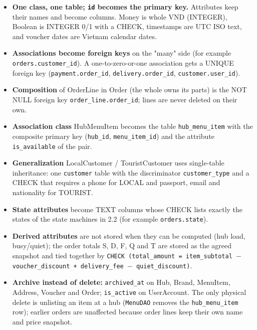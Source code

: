 \begin{itemize}
\item \textbf{One class, one table; \texttt{id} becomes the primary key.} Attributes keep their names and become columns. Money is whole VND (INTEGER), Boolean is INTEGER 0/1 with a CHECK, timestamps are UTC ISO text, and voucher dates are Vietnam calendar dates.

\item \textbf{Associations become foreign keys} on the "many" side (for example \texttt{orders.\allowbreak{}customer\_\allowbreak{}id}). A one-to-zero-or-one association gets a UNIQUE foreign key (\texttt{payment.\allowbreak{}order\_\allowbreak{}id}, \texttt{delivery.\allowbreak{}order\_\allowbreak{}id}, \texttt{customer.\allowbreak{}user\_\allowbreak{}id}).

\item \textbf{Composition} of OrderLine in Order (the whole owns its parts) is the NOT NULL foreign key \texttt{order\_\allowbreak{}line.\allowbreak{}order\_\allowbreak{}id}; lines are never deleted on their own.

\item \textbf{Association class} HubMenuItem becomes the table \texttt{hub\_\allowbreak{}menu\_\allowbreak{}item} with the composite primary key (\texttt{hub\_\allowbreak{}id}, \texttt{menu\_\allowbreak{}item\_\allowbreak{}id}) and the attribute \texttt{is\_\allowbreak{}available} of the pair.

\item \textbf{Generalization} LocalCustomer / TouristCustomer uses single-table inheritance: one \texttt{customer} table with the discriminator \texttt{customer\_\allowbreak{}type} and a CHECK that requires a phone for LOCAL and passport, email and nationality for TOURIST.

\item \textbf{State attributes} become TEXT columns whose CHECK lists exactly the states of the state machines in 2.2 (for example \texttt{orders.\allowbreak{}state}).

\item \textbf{Derived attributes} are not stored when they can be computed (hub load, busy/quiet); the order totals S, D, F, Q and T are stored as the agreed snapshot and tied together by \texttt{CHECK (total\_\allowbreak{}amount = item\_\allowbreak{}subtotal \ensuremath{-} voucher\_\allowbreak{}discount + delivery\_\allowbreak{}fee \ensuremath{-} quiet\_\allowbreak{}discount)}.

\item \textbf{Archive instead of delete:} \texttt{archived\_\allowbreak{}at} on Hub, Brand, MenuItem, Address, Voucher and Order; \texttt{is\_\allowbreak{}active} on UserAccount. The only physical delete is unlisting an item at a hub (\texttt{MenuDAO} removes the \texttt{hub\_\allowbreak{}menu\_\allowbreak{}item} row); earlier orders are unaffected because order lines keep their own name and price snapshot.


\end{itemize}
